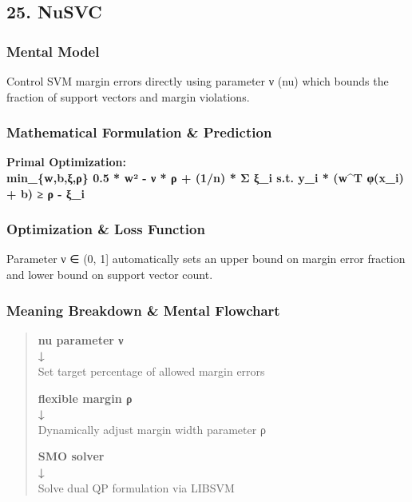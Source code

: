 \documentclass[
  10pt,
  letterpaper,
]{article}
\begin{document}
\hypertarget{nusvc}{%
\subsection{25. NuSVC}\label{nusvc}}

\hypertarget{mental-model-24}{%
\subsubsection{Mental Model}\label{mental-model-24}}

Control SVM margin errors directly using parameter ν (nu) which bounds the fraction of support vectors and margin violations.

\hypertarget{mathematical-formulation-prediction-24}{%
\subsubsection{Mathematical Formulation \& Prediction}\label{mathematical-formulation-prediction-24}}

\textbf{Primal Optimization:\\
min\_\{w,b,ξ,ρ\} 0.5 * \textbar\textbar w\textbar\textbar² - ν * ρ + (1/n) * Σ ξ\_i s.t. y\_i * (w\^{}T φ(x\_i) + b) ≥ ρ - ξ\_i}

\hypertarget{optimization-loss-function-24}{%
\subsubsection{Optimization \& Loss Function}\label{optimization-loss-function-24}}

Parameter ν ∈ (0, 1{]} automatically sets an upper bound on margin error fraction and lower bound on support vector count.

\hypertarget{meaning-breakdown-mental-flowchart-24}{%
\subsubsection{Meaning Breakdown \& Mental Flowchart}\label{meaning-breakdown-mental-flowchart-24}}

\begin{quote}
\textbf{nu parameter ν\\
↓\\
}Set target percentage of allowed margin errors

\textbf{flexible margin ρ\\
↓\\
}Dynamically adjust margin width parameter ρ

\textbf{SMO solver\\
↓\\
}Solve dual QP formulation via LIBSVM
\end{quote}
\end{document}
